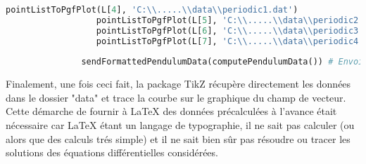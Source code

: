 \begin{center}
\begin{lstlisting}[language=Python, caption=Méthode d'Euler générale]
                  pointListToPgfPlot(L[4], 'C:\\.....\\data\\periodic1.dat')
                  pointListToPgfPlot(L[5], 'C:\\.....\\data\\periodic2.dat')
                  pointListToPgfPlot(L[6], 'C:\\.....\\data\\periodic3.dat')
                  pointListToPgfPlot(L[7], 'C:\\.....\\data\\periodic4.dat')
               
               sendFormattedPendulumData(computePendulumData()) # Envoie les donnees
         \end{lstlisting}
      \end{center}
      Finalement, une fois ceci fait, la package TikZ récupère directement les données dans le dossier "data" et trace la courbe sur le graphique du champ de vecteur. Cette démarche de fournir à LaTeX des données précalculées à l'avance était nécessaire car LaTeX étant un langage de typographie, il ne sait pas calculer (ou alors que des calculs trés simple) et il ne sait bien sûr pas résoudre ou tracer les solutions des équations différentielles considérées.
